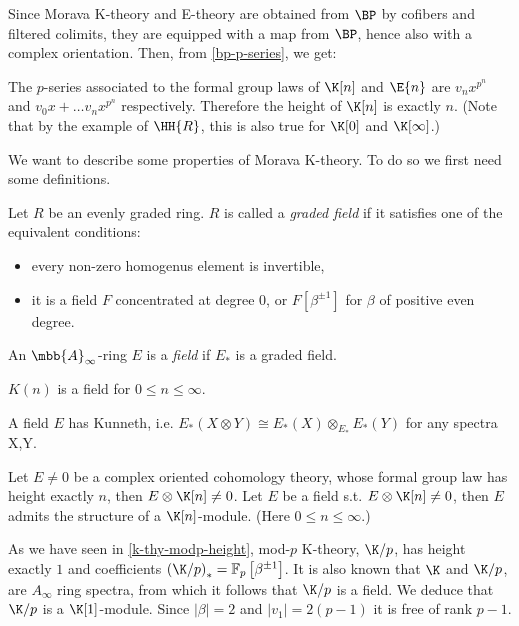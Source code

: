 Since Morava K-theory and E-theory are obtained from $\BP$ by cofibers and filtered colimits, they are equipped with a map from $\BP$, hence also with a complex orientation.
Then, from \ref{bp-p-series}, we get:

\begin{corollary}\label{k-e-p-series}
	The $p$-series associated to the formal group laws of $\K[n]$ and $\E{n}$ are $v_n x^{p^n}$ and $v_0 x + \dotsc v_n x^{p^n}$ respectively.
	Therefore the height of $\K[n]$ is exactly $n$.
	(Note that by the example of $\HH{R}$, this is also true for $\K[0]$ and $\K[\infty]$.)
\end{corollary}

We want to describe some properties of Morava K-theory.
To do so we first need some definitions.

\begin{definition}
	Let $R$ be an evenly graded ring.
	$R$ is called a \emph{graded field} if it satisfies one of the equivalent conditions:
	\begin{itemize}
		\item every non-zero homogenus element is invertible,
		\item it is a field $F$ concentrated at degree 0, or $F\left[\beta^{\pm1}\right]$ for $\beta$ of positive even degree.
	\end{itemize}
	An $\mbb{A}_\infty$-ring $E$ is a \emph{field} if $E_*$ is a graded field.
\end{definition}

\begin{example}
	$K\left(n\right)$ is a field for $0 \leq n \leq \infty$.
\end{example}

\begin{proposition}
	A field $E$ has Kunneth, i.e. $E_*\left(X\otimes Y\right)\cong E_*\left(X\right)\otimes_{E_*}E_*\left(Y\right)$ for any spectra X,Y.
\end{proposition}

\begin{proposition}
	Let $E \neq 0$ be a complex oriented cohomology theory, whose formal group law has height exactly $n$, then $E \otimes \K[n] \neq 0$.
	Let $E$ be a field s.t. $E \otimes \K[n] \neq 0$, then $E$ admits the structure of a $\K[n]$-module.
	(Here $0 \leq n \leq \infty$.)
\end{proposition}

\begin{example}\label{k-thy-modp-morava}
	As we have seen in \ref{k-thy-modp-height}, mod-$p$ K-theory, $\K/p$, has height exactly $1$ and coefficients $\left(\K/p\right)_* = \mathbb{F}_p \left[\beta^{\pm 1}\right]$.
	It is also known that $\K$ and $\K/p$, are $A_\infty$ ring spectra, from which it follows that $\K/p$ is a field.
	We deduce that $\K/p$ is a $\K[1]$-module.
	Since $\left|\beta\right| = 2$ and $\left|v_1\right| = 2\left(p-1\right)$ it is free of rank $p-1$.
\end{example}


